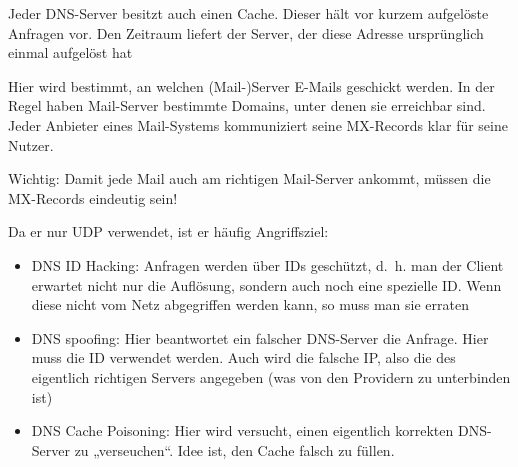 Jeder DNS-Server besitzt auch einen Cache.
Dieser hält vor kurzem aufgelöste Anfragen vor.
Den Zeitraum liefert der Server, der diese Adresse ursprünglich einmal aufgelöst hat

Hier wird bestimmt, an welchen (Mail-)Server E-Mails geschickt werden.
In der Regel haben Mail-Server bestimmte Domains, unter denen sie erreichbar sind.
Jeder Anbieter eines Mail-Systems kommuniziert seine MX-Records klar für seine Nutzer.

Wichtig: Damit jede Mail auch am richtigen Mail-Server ankommt, müssen die MX-Records eindeutig sein!

Da er nur UDP verwendet, ist er häufig Angriffsziel:
\begin{itemize}
    \item DNS ID Hacking: Anfragen werden über IDs geschützt, d.\ h. man der Client erwartet nicht nur die Auflösung, sondern auch noch eine spezielle ID. Wenn diese nicht vom Netz abgegriffen werden kann, so muss man sie erraten
    \item DNS spoofing: Hier beantwortet ein falscher DNS-Server die Anfrage.
    Hier muss die ID verwendet werden.
    Auch wird die falsche IP, also die des eigentlich richtigen Servers angegeben (was von den Providern zu unterbinden ist)
    \item DNS Cache Poisoning: Hier wird versucht, einen eigentlich korrekten DNS-Server zu „verseuchen“.
    Idee ist, den Cache falsch zu füllen.
\end{itemize}
